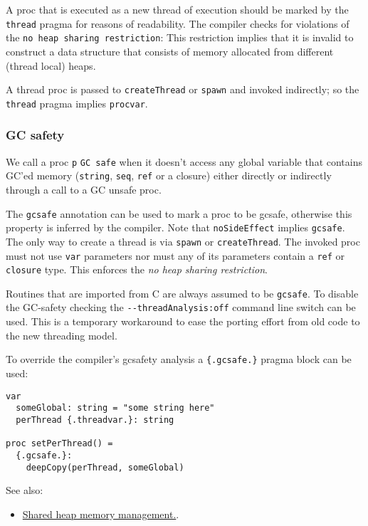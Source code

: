 A proc that is executed as a new thread of execution should be marked by
the \texttt{thread} pragma for reasons of readability. The compiler
checks for violations of the \texttt{no\ heap\ sharing\ restriction}:
This restriction implies that it is invalid to construct a data
structure that consists of memory allocated from different (thread
local) heaps.

A thread proc is passed to \texttt{createThread} or \texttt{spawn} and
invoked indirectly; so the \texttt{thread} pragma implies
\texttt{procvar}.

\hypertarget{gc-safety}{%
\subsubsection{GC safety}\label{gc-safety}}

We call a proc \texttt{p} \texttt{GC\ safe} when it doesn't access any
global variable that contains GC'ed memory (\texttt{string},
\texttt{seq}, \texttt{ref} or a closure) either directly or indirectly
through a call to a GC unsafe proc.

The \texttt{gcsafe} annotation can be used to mark a proc to be gcsafe,
otherwise this property is inferred by the compiler. Note that
\texttt{noSideEffect} implies \texttt{gcsafe}. The only way to create a
thread is via \texttt{spawn} or \texttt{createThread}. The invoked proc
must not use \texttt{var} parameters nor must any of its parameters
contain a \texttt{ref} or \texttt{closure} type. This enforces the
\emph{no heap sharing restriction}.

Routines that are imported from C are always assumed to be
\texttt{gcsafe}. To disable the GC-safety checking the
\texttt{-\/-threadAnalysis:off} command line switch can be used. This is
a temporary workaround to ease the porting effort from old code to the
new threading model.

To override the compiler's gcsafety analysis a \texttt{\{.gcsafe.\}}
pragma block can be used:

\begin{verbatim}
var
  someGlobal: string = "some string here"
  perThread {.threadvar.}: string

proc setPerThread() =
  {.gcsafe.}:
    deepCopy(perThread, someGlobal)
\end{verbatim}

See also:

\begin{itemize}
\tightlist
\item
  \href{gc.html}{Shared heap memory management.}.
\end{itemize}

